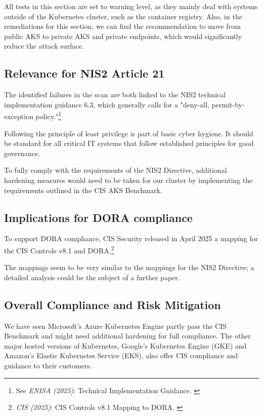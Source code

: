 All tests in this section are set to warning level, as they mainly deal with systems outside of the Kubernetes cluster, such as the container registry. Also, in the remediations for this section, we can find the recommendation to move from public AKS to private AKS and private endpoints, which would significantly reduce the attack surface.

\subsection{Relevance for NIS2 Article 21}

The identified failures in the scan are both linked to the NIS2 technical implementation guidance 6.3, which generally calls for a "deny-all, permit-by-exception policy."\footnote{See \textit{ENISA (2025)}: Technical Implementation Guidance. \cite{enisaTech}}

Following the principle of least privilege is part of basic cyber hygiene. It should be standard for all critical IT systems that follow established principles for good governance.

To fully comply with the requirements of the NIS2 Directive, additional hardening measures would need to be taken for our cluster by implementing the requirements outlined in the CIS AKS Benchmark.

\subsection{Implications for DORA compliance}

To support DORA compliance, CIS Security released in April 2025 a mapping for the CIS Controls v8.1 and DORA.\footnote{\textit{CIS (2025)}: CIS Controls v8.1 Mapping to DORA. \cite{cisMapDora}}

The mappings seem to be very similar to the mappings for the NIS2 Directive; a detailed analysis could be the subject of a further paper.

\subsection{Overall Compliance and Risk Mitigation}

We have seen Microsoft's Azure Kubernetes Engine partly pass the CIS Benchmark and might need additional hardening for full compliance. The other major hosted versions of Kubernetes, Google's Kubernetes Engine (GKE) and Amazon's Elastic Kubernetes Service (EKS), also offer CIS compliance and guidance to their customers.

